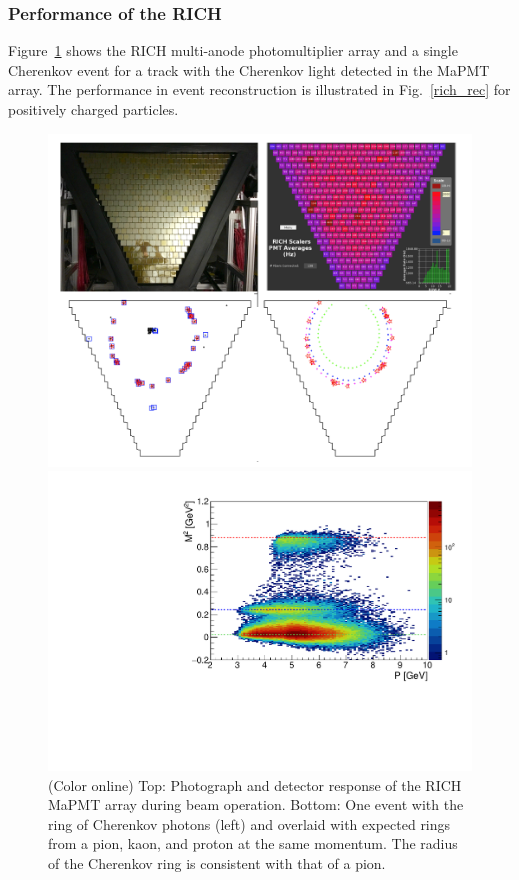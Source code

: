 \documentclass[final,3p,twocolumn]{elsarticle}
\begin{document}
\subsubsection{Performance of the RICH} 

Figure~\ref{rich-event} shows the RICH multi-anode photomultiplier array and a single Cherenkov event for a
track with the Cherenkov light detected in the MaPMT array.  The performance in event reconstruction is
illustrated in Fig.~\ref{rich_rec} for positively charged particles. 

\begin{figure}[t!]
\centerline{\includegraphics[width=1.0\columnwidth]{rich-event.png}}
\caption{(Color online) Top: Photograph and detector response of the RICH MaPMT array during beam operation. Bottom: One
  event with the ring of Cherenkov photons (left) and overlaid with expected rings from a pion, kaon, and proton
  at the same momentum. The radius of the Cherenkov ring is consistent with that of a pion.}
\label{rich-event}
\vspace{0.3cm}\centerline{\includegraphics[width=1.0\columnwidth]{mass_PID.pdf}}

\end{figure}
\end{document}

